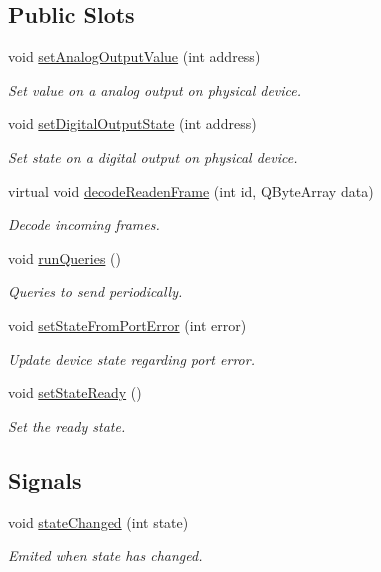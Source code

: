 \subsection*{Public Slots}
\begin{DoxyCompactItemize}
\item 
void \hyperlink{classmdt_device_a40234a70a37b097baa48bdfbb402cdc4}{setAnalogOutputValue} (int address)
\begin{DoxyCompactList}\small\item\em Set value on a analog output on physical device. \end{DoxyCompactList}\item 
void \hyperlink{classmdt_device_a83b170f1805a05101409bb6d8e15d03a}{setDigitalOutputState} (int address)
\begin{DoxyCompactList}\small\item\em Set state on a digital output on physical device. \end{DoxyCompactList}\item 
virtual void \hyperlink{classmdt_device_a96be3ca9235561c58c69190e9ed45ca9}{decodeReadenFrame} (int id, QByteArray data)
\begin{DoxyCompactList}\small\item\em Decode incoming frames. \end{DoxyCompactList}\item 
void \hyperlink{classmdt_device_a14634fec6cd6bae810562b3bd88a5c05}{runQueries} ()
\begin{DoxyCompactList}\small\item\em Queries to send periodically. \end{DoxyCompactList}\item 
void \hyperlink{classmdt_device_ab77eb4c1bb50201e97a4dbd8b538659a}{setStateFromPortError} (int error)
\begin{DoxyCompactList}\small\item\em Update device state regarding port error. \end{DoxyCompactList}\item 
void \hyperlink{classmdt_device_a4eeda85bf0b10ddc9955a32199c00359}{setStateReady} ()
\begin{DoxyCompactList}\small\item\em Set the ready state. \end{DoxyCompactList}\end{DoxyCompactItemize}
\subsection*{Signals}
\begin{DoxyCompactItemize}
\item 
\hypertarget{classmdt_device_aecd2d9d2cc3665f2084d0fd20eb3db2d}{
void \hyperlink{classmdt_device_aecd2d9d2cc3665f2084d0fd20eb3db2d}{stateChanged} (int state)}
\label{classmdt_device_aecd2d9d2cc3665f2084d0fd20eb3db2d}

\begin{DoxyCompactList}\small\item\em Emited when state has changed. \end{DoxyCompactList}\end{DoxyCompactItemize}
